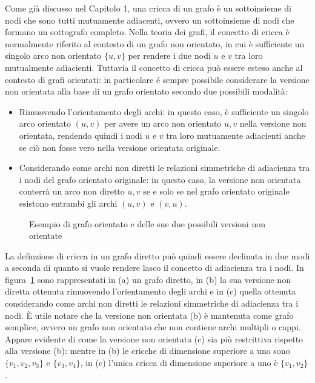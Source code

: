 Come gi\`a discusso nel Capitolo 1, una cricca di un grafo \`e un sottoinsieme di nodi che sono tutti mutuamente
adiacenti, ovvero un sottoinsieme di nodi che formano un sottografo completo.
Nella teoria dei grafi, il concetto di cricca \`e normalmente riferito al contesto di un grafo non orientato,
in cui \`e sufficiente un singolo arco non orientato $\{u, v\}$ per rendere i due nodi $u$ e $v$ tra loro
mutualmente adiacienti.
Tuttavia il concetto di cricca pu\`o essere esteso anche al contesto di grafi orientati: in particolare \'e sempre
possibile considerare la versione non orientata alla base di un grafo orientato secondo due possibili modalit\`a:
\begin{itemize}
    \item Rimuovendo l'orientamento degli archi: in questo caso, \`e sufficiente un singolo arco orientato $(u, v)$
        per avere un arco non orientato ${u, v}$ nella versione non orientata, rendendo quindi i nodi $u$ e $v$ tra loro
        mutuamente adiacienti anche se ci\`o non fosse vero nella versione orientata originale.
    \item Considerando come archi non diretti le relazioni simmetriche di adiacienza tra i nodi del grafo orientato
        originale: in questo caso, la versione non orientata conterr\`a un arco non diretto ${u, v}$ se e solo se
        nel grafo orientato originale esistono entrambi gli archi $(u, v)$ e $(v, u)$.
\end{itemize}

\begin{figure}[H]
    \centering
    
    \caption{Esempio di grafo orientato e delle sue due possibili versioni non orientate}
    \label{fig:undirected_version_example}
\end{figure}

La definzione di cricca in un grafo diretto pu\`o quindi essere declinata in due modi a seconda di quanto si vuole
rendere lasco il concetto di adiacienza tra i nodi.
In figura~\ref{fig:undirected_version_example} sono rappresentati in (a) un grafo diretto, in (b) la sua versione non
diretta ottenuta rimuovendo l'orientamento degli archi e in (c) quella ottenuta considerando come archi non diretti le
relazioni simmetriche di adiacienza tra i nodi. \`E utile notare che la versione non orientata (b) \`e mantenuta come
grafo semplice, ovvero un grafo non orientato che non contiene archi multipli o cappi.
Appare evidente di come la versione non orientata (c) sia pi\`u restrittiva rispetto alla versione (b): mentre
in (b) le cricche di dimensione superiore a uno sono $\{v_1, v_2, v_3\}$ e $\{v_3, v_4\}$, in (c) l'unica
cricca di dimensione superiore a uno \`e $\{v_1, v_2\}$. \newline

